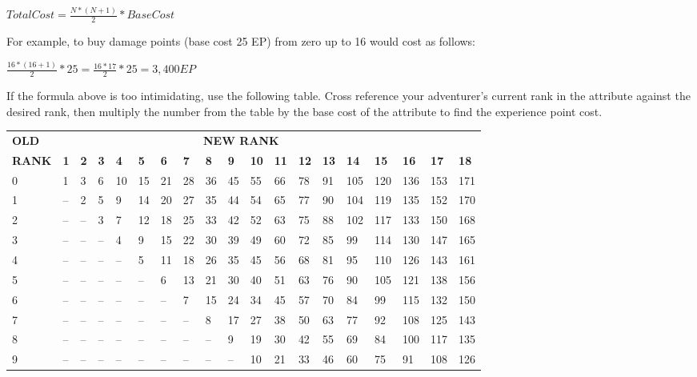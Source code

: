 \begin{multicols*}{2}
$Total Cost = \frac{N * (N+1)}{2} * Base Cost$

For example, to buy damage points (base cost 25 EP) from zero up to 16 would cost as follows:

$\frac{16 * (16+1)}{2} * 25 = \frac{16*17}{2} * 25 = 3,400 EP$

If the formula above is too intimidating, use the following table. Cross reference your adventurer’s current rank in the attribute against the desired rank, then multiply the number from the table by the base cost of the attribute to find the experience point cost.

\end{multicols*}
\begin{tcolorbox}[breakable,boxrule=0pt]
\begin{tabular}{@{}l l l l l l l l l l l l l l l l l l l}
\textbf{OLD} & \multicolumn{16}{c}{\textbf{NEW RANK}}\\
\textbf{RANK} & \textbf{1} & \textbf{2} & \textbf{3} & \textbf{4} & \textbf{5} & \textbf{6} & \textbf{7} & \textbf{8} & \textbf{9} & \textbf{10} & \textbf{11} & \textbf{12} & \textbf{13} & \textbf{14} & \textbf{15} & \textbf{16} & \textbf{17} & \textbf{18}\\
0 & 1 & 3 & 6 & 10 & 15 & 21 & 28 & 36 & 45 & 55 & 66 & 78 & 91 & 105 & 120 & 136 & 153 & 171\\
1 & -- & 2 & 5 & 9 & 14 & 20 & 27 & 35 & 44 & 54 & 65 & 77 & 90 & 104 & 119 & 135 & 152 & 170\\
2 & -- & -- & 3 & 7 & 12 & 18 & 25 & 33 & 42 & 52 & 63 & 75 & 88 & 102 & 117 & 133 & 150 & 168\\
3 & -- & -- & -- & 4 & 9 & 15 & 22 & 30 & 39 & 49 & 60 & 72 & 85 & 99 & 114 & 130 & 147 & 165\\
4 & -- & -- & -- & -- & 5 & 11 & 18 & 26 & 35 & 45 & 56 & 68 & 81 & 95 & 110 & 126 & 143 & 161\\
5 & -- & -- & -- & -- & -- & 6 & 13 & 21 & 30 & 40 & 51 & 63 & 76 & 90 & 105 & 121 & 138 & 156\\
6 & -- & -- & -- & -- & -- & -- & 7 & 15 & 24 & 34 & 45 & 57 & 70 & 84 & 99 & 115 & 132 & 150\\
7 & -- & -- & -- & -- & -- & -- & -- & 8 & 17 & 27 & 38 & 50 & 63 & 77 & 92 & 108 & 125 & 143\\
8 & -- & -- & -- & -- & -- & -- & -- & -- & 9 & 19 & 30 & 42 & 55 & 69 & 84 & 100 & 117 & 135\\
9 & -- & -- & -- & -- & -- & -- & -- & -- & -- & 10 & 21 & 33 & 46 & 60 & 75 & 91 & 108 & 126\\

\end{tabular}
\end{tcolorbox}
